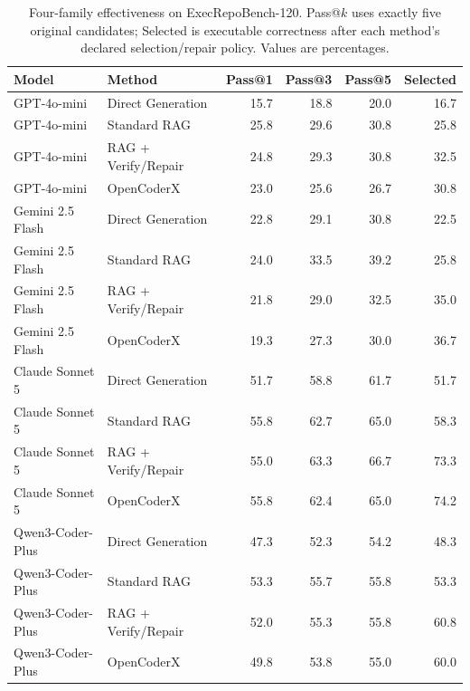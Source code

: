 \begin{table}[t]
\centering
\small
\caption{Four-family effectiveness on ExecRepoBench-120. Pass@$k$ uses exactly five original candidates; Selected is executable correctness after each method's declared selection/repair policy. Values are percentages.}
\label{tab:four_family_effectiveness}
\begin{tabular}{llrrrr}
\toprule
Model & Method & Pass@1 & Pass@3 & Pass@5 & Selected \\
\midrule
GPT-4o-mini & Direct Generation & 15.7 & 18.8 & 20.0 & 16.7 \\
GPT-4o-mini & Standard RAG & 25.8 & 29.6 & 30.8 & 25.8 \\
GPT-4o-mini & RAG + Verify/Repair & 24.8 & 29.3 & 30.8 & 32.5 \\
GPT-4o-mini & OpenCoderX & 23.0 & 25.6 & 26.7 & 30.8 \\
\midrule
Gemini 2.5 Flash & Direct Generation & 22.8 & 29.1 & 30.8 & 22.5 \\
Gemini 2.5 Flash & Standard RAG & 24.0 & 33.5 & 39.2 & 25.8 \\
Gemini 2.5 Flash & RAG + Verify/Repair & 21.8 & 29.0 & 32.5 & 35.0 \\
Gemini 2.5 Flash & OpenCoderX & 19.3 & 27.3 & 30.0 & 36.7 \\
\midrule
Claude Sonnet 5 & Direct Generation & 51.7 & 58.8 & 61.7 & 51.7 \\
Claude Sonnet 5 & Standard RAG & 55.8 & 62.7 & 65.0 & 58.3 \\
Claude Sonnet 5 & RAG + Verify/Repair & 55.0 & 63.3 & 66.7 & 73.3 \\
Claude Sonnet 5 & OpenCoderX & 55.8 & 62.4 & 65.0 & 74.2 \\
\midrule
Qwen3-Coder-Plus & Direct Generation & 47.3 & 52.3 & 54.2 & 48.3 \\
Qwen3-Coder-Plus & Standard RAG & 53.3 & 55.7 & 55.8 & 53.3 \\
Qwen3-Coder-Plus & RAG + Verify/Repair & 52.0 & 55.3 & 55.8 & 60.8 \\
Qwen3-Coder-Plus & OpenCoderX & 49.8 & 53.8 & 55.0 & 60.0 \\
\bottomrule
\end{tabular}
\end{table}

